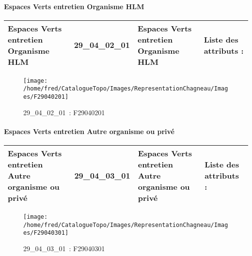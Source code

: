 \documentclass[12pt,titlepage,oneside]{book}
\begin{document}
\paragraph{Espaces Verts entretien Organisme HLM}
\noindent
\vspace{\baselineskip}

\renewcommand{\arraystretch}{1.2}
\begin{supertabular}{|p{10cm}|c|p{13cm}|p{12cm}|}
 Espaces Verts entretien Organisme HLM & 29\_04\_02\_01 & Espaces Verts entretien Organisme HLM & Liste des attributs :
\begin{enumerate}
\end{enumerate}
\\
\hline
\end{supertabular}
\begin{figure}[h!]
  \hfill         %
  \begin{minipage}[t]{3cm}
    \begin{center}
      \texttt{[image: /home/fred/CatalogueTopo/Images/RepresentationChagneau/Images/F29040201]}
      \caption[~29\_04\_02\_01]{\small{29\_04\_02\_01~:} \tiny{F29040201}}\label{F29040201}
    \end{center}
  \end{minipage}
\end{figure}


\paragraph{Espaces Verts entretien Autre organisme ou privé}
\noindent
\vspace{\baselineskip}

\renewcommand{\arraystretch}{1.2}
\begin{supertabular}{|p{10cm}|c|p{13cm}|p{12cm}|}
 Espaces Verts entretien Autre organisme ou privé & 29\_04\_03\_01 & Espaces Verts entretien Autre organisme ou privé & Liste des attributs :
\begin{enumerate}
\end{enumerate}
\\
\hline
\end{supertabular}
\begin{figure}[h!]
  \hfill         %
  \begin{minipage}[t]{3cm}
    \begin{center}
      \texttt{[image: /home/fred/CatalogueTopo/Images/RepresentationChagneau/Images/F29040301]}
      \caption[~29\_04\_03\_01]{\small{29\_04\_03\_01~:} \tiny{F29040301}}\label{F29040301}
    \end{center}
  \end{minipage}
\end{figure}
\end{document}
